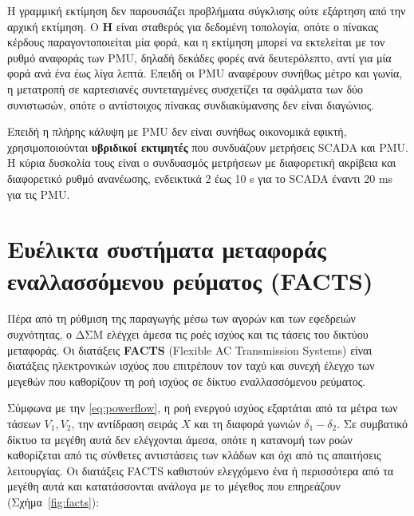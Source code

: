 Η γραμμική εκτίμηση δεν παρουσιάζει προβλήματα σύγκλισης ούτε εξάρτηση από την αρχική
εκτίμηση. Ο $\mathbf{H}$ είναι σταθερός για δεδομένη τοπολογία, οπότε ο πίνακας κέρδους
παραγοντοποιείται μία φορά, και η εκτίμηση μπορεί να εκτελείται με τον ρυθμό αναφοράς των
PMU, δηλαδή δεκάδες φορές ανά δευτερόλεπτο, αντί για μία φορά ανά ένα έως λίγα λεπτά. Επειδή
οι PMU αναφέρουν συνήθως μέτρο και γωνία, η μετατροπή σε καρτεσιανές συντεταγμένες συσχετίζει
τα σφάλματα των δύο συνιστωσών, οπότε ο αντίστοιχος πίνακας συνδιακύμανσης δεν είναι
διαγώνιος.

Επειδή η πλήρης κάλυψη με PMU δεν είναι συνήθως οικονομικά εφικτή, χρησιμοποιούνται
\textbf{υβριδικοί εκτιμητές} που συνδυάζουν μετρήσεις SCADA και PMU. Η κύρια δυσκολία τους
είναι ο συνδυασμός μετρήσεων με διαφορετική ακρίβεια και διαφορετικό ρυθμό ανανέωσης,
ενδεικτικά 2 έως 10 s για το SCADA έναντι 20 ms για τις PMU.

\section{Ευέλικτα συστήματα μεταφοράς εναλλασσόμενου ρεύματος (FACTS)}

Πέρα από τη ρύθμιση της παραγωγής μέσω των αγορών και των εφεδρειών συχνότητας, ο ΔΣΜ
ελέγχει άμεσα τις ροές ισχύος και τις τάσεις του δικτύου μεταφοράς. Οι διατάξεις
\textbf{FACTS} (Flexible AC Transmission Systems) είναι διατάξεις ηλεκτρονικών ισχύος που
επιτρέπουν τον ταχύ και συνεχή έλεγχο των μεγεθών που καθορίζουν τη ροή ισχύος σε δίκτυο
εναλλασσόμενου ρεύματος.

Σύμφωνα με την \eqref{eq:powerflow}, η ροή ενεργού ισχύος εξαρτάται από τα μέτρα των τάσεων
$V_1, V_2$, την αντίδραση σειράς $X$ και τη διαφορά γωνιών $\delta_1 - \delta_2$. Σε
συμβατικό δίκτυο τα μεγέθη αυτά δεν ελέγχονται άμεσα, οπότε η κατανομή των ροών καθορίζεται
από τις σύνθετες αντιστάσεις των κλάδων και όχι από τις απαιτήσεις λειτουργίας. Οι διατάξεις
FACTS καθιστούν ελεγχόμενο ένα ή περισσότερα από τα μεγέθη αυτά και κατατάσσονται ανάλογα με
το μέγεθος που επηρεάζουν (Σχήμα~\ref{fig:facts}):


